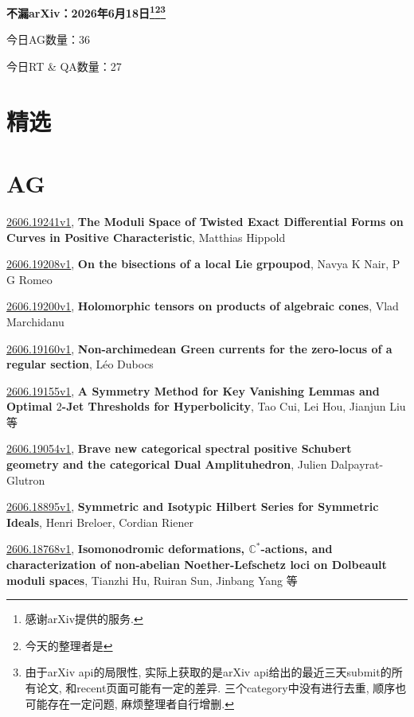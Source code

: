 \documentclass[9pt, a4paper]{article}
\theoremstyle{plain}
\theoremstyle{definition}
\theoremstyle{remark}
\newcommand{\arxiv}[3]{\href{https://arxiv.org/abs/#1}{#1}, \textbf{\textcolor{arxivblue}{#2}}, #3}
\newcommand{\AGnumber}{36}
\newcommand{\RTQAnumber}{27}
\newcommand{\NewestDate}{2026年6月18日}
\newcommand{\todayarXiver}{} %
\begin{document}
\begin{center}
    \Huge\textbf{不漏arXiv：\NewestDate\footnote{感谢arXiv提供的服务.}\footnote{今天的整理者是\todayarXiver}\footnote{由于arXiv api的局限性, 实际上获取的是arXiv api给出的最近三天submit的所有论文, 和recent页面可能有一定的差异. 三个category中没有进行去重, 顺序也可能存在一定问题, 麻烦整理者自行增删.}} \\
\end{center}

\setcounter{section}{-1}

\begin{center}
    今日AG数量：\AGnumber
    
    今日RT \& QA数量：\RTQAnumber
    
\end{center}


\section{精选}


\section{AG}
\arxiv{2606.19241v1}{The Moduli Space of Twisted Exact Differential Forms on Curves in Positive Characteristic}{Matthias Hippold}

\arxiv{2606.19208v1}{On the bisections of a local Lie grpoupod}{Navya K Nair, P G Romeo}

\arxiv{2606.19200v1}{Holomorphic tensors on products of algebraic cones}{Vlad Marchidanu}

\arxiv{2606.19160v1}{Non-archimedean Green currents for the zero-locus of a regular section}{Léo Dubocs}

\arxiv{2606.19155v1}{A Symmetry Method for Key Vanishing Lemmas and Optimal $2$-Jet Thresholds for Hyperbolicity}{Tao Cui, Lei Hou, Jianjun Liu 等}

\arxiv{2606.19054v1}{Brave new categorical spectral positive Schubert geometry and the categorical Dual Amplituhedron}{Julien Dalpayrat-Glutron}

\arxiv{2606.18895v1}{Symmetric and Isotypic Hilbert Series for Symmetric Ideals}{Henri Breloer, Cordian Riener}

\arxiv{2606.18768v1}{Isomonodromic deformations, $\mathbb C^*$-actions, and characterization of non-abelian Noether-Lefschetz loci on Dolbeault moduli spaces}{Tianzhi Hu, Ruiran Sun, Jinbang Yang 等}
\end{document}
